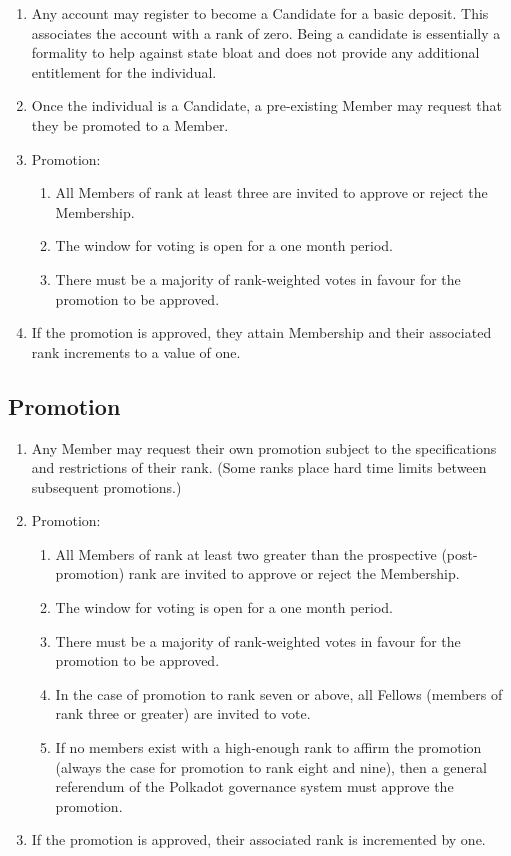 \documentclass[9pt,oneside]{amsart}
\begin{document}
\begin{enumerate}
\item Any account may register to become a Candidate for a basic deposit. This associates the account with a rank of zero. Being a candidate is essentially a formality to help against state bloat and does not provide any additional entitlement for the individual.
\item Once the individual is a Candidate, a pre-existing Member may request that they be promoted to a Member.
\item Promotion:
  \begin{enumerate}
    \item All Members of rank at least three are invited to approve or reject the Membership.
    \item The window for voting is open for a one month period.
    \item There must be a majority of rank-weighted votes in favour for the promotion to be approved.
  \end{enumerate}
\item If the promotion is approved, they attain Membership and their associated rank increments to a value of one.
\end{enumerate}

\subsection{Promotion}

\begin{enumerate}
\item Any Member may request their own promotion subject to the specifications and restrictions of their rank. (Some ranks place hard time limits between subsequent promotions.)
\item Promotion:
  \begin{enumerate}
    \item All Members of rank at least two greater than the prospective (post-promotion) rank are invited to approve or reject the Membership.
    \item The window for voting is open for a one month period.
    \item There must be a majority of rank-weighted votes in favour for the promotion to be approved.
    \item In the case of promotion to rank seven or above, all Fellows (members of rank three or greater) are invited to vote.
    \item If no members exist with a high-enough rank to affirm the promotion (always the case for promotion to rank eight and nine), then a general referendum of the Polkadot governance system must approve the promotion.
  \end{enumerate}
\item If the promotion is approved, their associated rank is incremented by one.
\end{enumerate}
\end{document}
